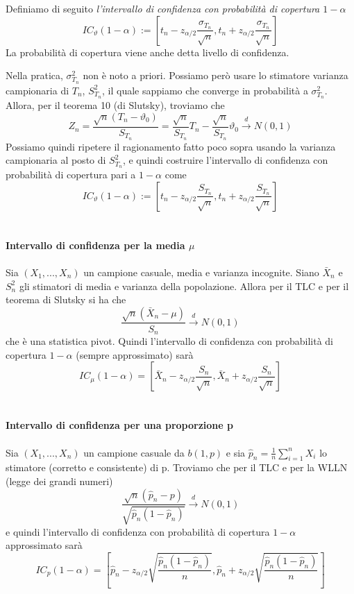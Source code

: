 Definiamo di seguito \textit{l'intervallo di confidenza con probabilità di copertura $1-\alpha$} $$IC_\vartheta (1-\alpha) := \left[t_n - z_{\alpha / 2} \frac{\sigma_{T_n}}{\sqrt{n}}, t_n + z_{\alpha / 2} \frac{\sigma_{T_n}}{\sqrt{n}}\right]$$
La probabilità di copertura viene anche detta livello di confidenza.

Nella pratica, $\sigma^2_{T_n}$ non è noto a priori. Possiamo però usare lo stimatore varianza campionaria di $T_n$, $S^2_{T_n}$, il quale sappiamo che converge in probabilità a $\sigma^2_{T_n}$. Allora, per il teorema 10 (di Slutsky), troviamo che 
$$Z_n=\frac{\sqrt{n}(T_n - \vartheta_0)}{S_{T_n}} = \frac{\sqrt{n}}{S_{T_n}} T_n - \frac{\sqrt{n}}{S_{T_n}} \vartheta_0 \stackrel{d}{\rightarrow}N(0,1)$$ Possiamo quindi ripetere il ragionamento fatto poco sopra usando la varianza campionaria al posto di $S^2_{T_n}$, e quindi costruire l'intervallo di confidenza con probabilità di copertura pari a $1 - \alpha$ come $$IC_\vartheta (1-\alpha) := \left[t_n - z_{\alpha / 2} \frac{S_{T_n}}{\sqrt{n}}, t_n + z_{\alpha / 2} \frac{S_{T_n}}{\sqrt{n}}\right]$$
\\ \\
\noindent\textbf{Intervallo di confidenza per la media $\mu$}
\\ \\
Sia $(X_1,...,X_n)$ un campione casuale, media e varianza incognite. Siano $\bar{X}_n$ e $S^2_n$ gli stimatori di media e varianza della popolazione. Allora per il TLC e per il teorema di Slutsky si ha che 
$$\frac{\sqrt{n}(\bar{X}_n - \mu)}{S_n} \stackrel{d}{\rightarrow}N(0,1)$$
che è una statistica pivot. Quindi l'intervallo di confidenza con probabilità di copertura $1-\alpha$ (sempre approssimato) sarà
$$IC_\mu(1-\alpha)=\left[\bar{X}_n - z_{\alpha / 2} \frac{S_n}{\sqrt{n}}, \bar{X}_n + z_{\alpha / 2} \frac{S_n}{\sqrt{n}}\right]$$
\\ \\
\noindent\textbf{Intervallo di confidenza per una proporzione p}
\\ \\
Sia $(X_1,...,X_n)$ un campione casuale da $b(1,p)$ e sia $\hat{p}_n=\frac{1}{n} \sum_{i=1}^n X_i$ lo stimatore (corretto e consistente) di p. Troviamo che per il TLC e per la WLLN (legge dei grandi numeri) $$\frac{\sqrt{n}(\hat{p}_n - p)}{\sqrt{\hat{p}_n(1-\hat{p}_n)}} \stackrel{d}{\rightarrow}N(0,1)$$
e quindi l'intervallo di confidenza con probabilità di copertura $1-\alpha$ approssimato sarà
$$IC_p(1-\alpha)=
\left[\hat{p}_n -
 z_{\alpha / 2} 
 \sqrt{\frac{\hat{p}_n(1-\hat{p}_n)}{n}},
  \hat{p}_n + z_{\alpha / 2}\sqrt{\frac{\hat{p}_n(1-\hat{p}_n)}{n}}\right]$$